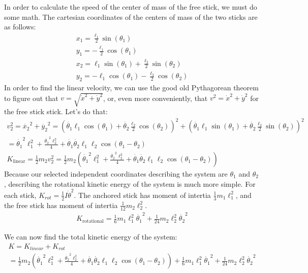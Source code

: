 \documentclass[]{article}
\begin{document}
In order to calculate the speed of the center of mass of the free stick, we must do some math. The cartesian coordinates of the centers of mass of the two sticks are as follows:
\begin{gather*}
x_1 = \frac{\ell_1}{2}\sin(\theta_1) \\
y_1 = -\frac{\ell_1}{2}\cos(\theta_1) \\
x_2 = \ell_1\sin(\theta_1) + \frac{\ell_2}{2}\sin(\theta_2) \\
y_2 = -\ell_1\cos(\theta_1) - \frac{\ell_2}{2}\cos(\theta_2)
\end{gather*}
In order to find the linear velocity, we can use the good old Pythagorean theorem to figure out that $v = \sqrt{\dot{x}^2 + \dot{y}^2}$, or, even more conveniently, that $v^2 = \dot{x}^2 + \dot{y}^2$ for the free stick stick. Let's do that:
\begin{gather*}
	v_2^2 = \dot{x_2}^2 + \dot{y_2}^2 = (\dot{\theta_1}\ell_1\cos(\theta_1) + \dot{\theta_2}\frac{\ell_2}{2}\cos(\theta_2))^2 + (\dot{\theta_1}\ell_1\sin(\theta_1) + \dot{\theta_2}\frac{\ell_2}{2}\sin(\theta_2))^2 \\
	= \dot{\theta_1}^2\ell_1^2 + \frac{\dot{\theta_2}^2\ell_2^2}{4} + \dot{\theta_1}\dot{\theta_2}\ell_1\ell_2\cos(\theta_1 - \theta_2) \\
	K_{\text{linear}} = \frac12m_2v_2^2 = \frac12m_2(\dot{\theta_1}^2\ell_1^2 + \frac{\dot{\theta_2}^2\ell_2^2}{4} + \dot{\theta_1}\dot{\theta_2}\ell_1\ell_2\cos(\theta_1 - \theta_2))
\end{gather*}
Because our selected independent coordinates describing the system are $\theta_1$ and $\theta_2$, describing the rotational kinetic energy of the system is much more simple. For each stick, $K_{rot} = \frac12 I \dot{\theta}^2$. The anchored stick has moment of intertia $\frac13m_1\ell_1^2$, and the free stick has moment of intertia $\frac{1}{12}m_2\ell_2^2$.
\begin{gather*}
	K_{\text{rotational}} = \frac16m_1\ell_1^2\dot{\theta_1}^2 + \frac{1}{24}m_2\ell_2^2\dot{\theta_2}^2
\end{gather*}

We can now find the total kinetic energy of the system:
\begin{gather*}
	K = K_{linear} + K_{rot} \\
	= \frac12m_2(\dot{\theta_1}^2\ell_1^2 + \frac{\dot{\theta_2}^2\ell_2^2}{4} + \dot{\theta_1}\dot{\theta_2}\ell_1\ell_2\cos(\theta_1 - \theta_2)) + \frac16m_1\ell_1^2\dot{\theta_1}^2 + \frac{1}{24}m_2\ell_2^2\dot{\theta_2}^2
\end{gather*}
\end{document}
